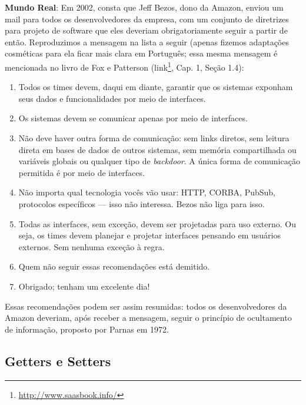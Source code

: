 \documentclass[
  11pt,
  twoside]{book}
\DeclareRobustCommand{\href}[2]{#2\footnote{\url{#1}}}
\newenvironment{esmbox}{\centering \vspace{1.5ex} \begin{tcolorbox}[breakable, colback=backcolor, width=4.9in]}{\end{tcolorbox} \vspace{1.5ex}}
\begin{document}
\begin{esmbox} 

\textbf{Mundo Real}: Em 2002, consta que Jeff Bezos, dono da Amazon,
enviou um mail para todos os desenvolvedores da empresa, com um conjunto
de diretrizes para projeto de software que eles deveriam
obrigatoriamente seguir a partir de então. Reproduzimos a mensagem na
lista a seguir (apenas fizemos adaptações cosméticas para ela ficar mais
clara em Português; essa mesma mensagem é mencionada no livro de Fox e
Patterson (\href{http://www.saasbook.info/}{link}, Cap. 1, Seção 1.4):

\begin{enumerate}
\def\labelenumi{\arabic{enumi}.}
\item
  Todos os times devem, daqui em diante, garantir que os sistemas
  exponham seus dados e funcionalidades por meio de interfaces.
\item
  Os sistemas devem se comunicar apenas por meio de interfaces.
\item
  Não deve haver outra forma de comunicação: sem links diretos, sem
  leitura direta em bases de dados de outros sistemas, sem memória
  compartilhada ou variáveis globais ou qualquer tipo de
  \emph{backdoor}. A única forma de comunicação permitida é por meio de
  interfaces.
\item
  Não importa qual tecnologia vocês vão usar: HTTP, CORBA, PubSub,
  protocolos específicos --- isso não interessa. Bezos não liga para
  isso.
\item
  Todas as interfaces, sem exceção, devem ser projetadas para uso
  externo. Ou seja, os times devem planejar e projetar interfaces
  pensando em usuários externos. Sem nenhuma exceção à regra.
\item
  Quem não seguir essas recomendações está demitido.
\item
  Obrigado; tenham um excelente dia!
\end{enumerate}

Essas recomendações podem ser assim resumidas: todos os desenvolvedores da Amazon deveriam, após receber a mensagem, seguir o princípio de ocultamento de informação, proposto por Parnas em 1972.

\end{esmbox} 

\hypertarget{getters-e-setters}{%
\subsection{Getters e Setters}\label{getters-e-setters}}
\end{document}
